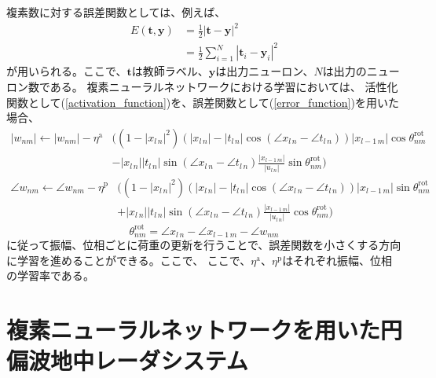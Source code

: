 \documentclass[11pt,a4paper,uplatex]{ujarticle}
\begin{document}
    複素数に対する誤差関数としては、例えば、
    \begin{equation}\label{error_function}
      \begin{split}
      E(\bm{t}, \bm{y})  & = \frac{1}{2}|\bm{t} - \bm{y}|^2\\
      & = \frac{1}{2}\sum_{i=1}^{N}|\bm{t}_i - \bm{y}_i|^2
      \end{split}
    \end{equation}
    が用いられる。ここで、$\bm{t}$は教師ラベル、$\bm{y}$は出力ニューロン、$N$は出力のニューロン数である。
    複素ニューラルネットワークにおける学習においては、
    活性化関数として(\ref{activation_function})を、誤差関数として(\ref{error_function})を用いた場合、
    \begin{equation}
      \label{eq:update_a}
      \begin{split}
        |w_{nm}| \leftarrow |w_{nm}| - \eta^\mathrm{a} & \biggl( (1-|x_{l\,n}|^2)(|x_{l\, n}| - |t_{l\, n}| \cos (\angle x_{l\, n} - \angle t_{l\, n}))|x_{l-1\, m}| \cos \theta^{\mathrm{rot}}_{nm}  \\
                        & - |x_{l\, n}| |t_{l\, n}| \sin (\angle x_{l\, n} - \angle t_{l\, n}) \frac{|x_{l-1\, m}|}{|u_{l\, n}|} \sin \theta^{\mathrm{rot}}_{nm} \biggr)
      \end{split}
    \end{equation}
    \begin{equation}
      \label{eq:update_p}
      \begin{split}
        \angle w_{nm} \leftarrow \angle w_{nm} - \eta^\mathrm{p} & \bigg( (1-|x_{l\,n}|^2)(|x_{l\, n}| - |t_{l\, n}| \cos (\angle x_{l\, n} - \angle t_{l\, n}))|x_{l-1\, m}| \sin \theta^{\mathrm{rot}}_{nm} \\
                        &  + |x_{l\, n}| |t_{l\, n}| \sin (\angle x_{l\, n} - \angle t_{l\, n}) \frac{|x_{l-1\, m}|}{|u_{l\, n}|} \cos \theta^{\mathrm{rot}}_{nm} \bigg)
      \end{split}
    \end{equation}
    \begin{equation}
      \label{eq:rot}
        \theta^{\mathrm{rot}}_{nm} = \angle x_{l\, n} - \angle x_{l-1\, m} -\angle w_{nm}
    \end{equation}
    に従って振幅、位相ごとに荷重の更新を行うことで、誤差関数を小さくする方向に学習を進めることができる。ここで、
    ここで、$\eta^\mathrm{a}$、$\eta^\mathrm{p}$はそれぞれ振幅、位相の学習率である\cite{CVNN}。

\section{複素ニューラルネットワークを用いた円偏波地中レーダシステム}
\end{document}
